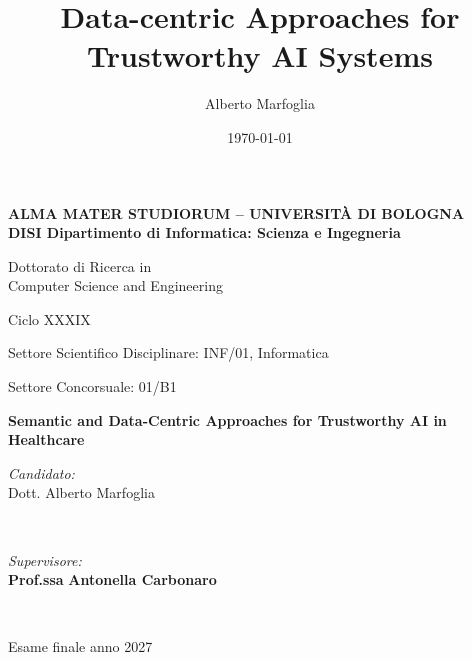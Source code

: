 \title{Data-centric Approaches for Trustworthy AI Systems}
\author{Alberto Marfoglia}
\date{\today}

\begin{titlepage}
	\begin{center}

		\large
		\textbf{ALMA MATER STUDIORUM -- UNIVERSITÀ DI BOLOGNA \\ DISI Dipartimento di Informatica: Scienza e Ingegneria}
		\\
		\noindent\hrulefill
		\vspace{0.4cm}

		\Large
		Dottorato di Ricerca in \\
		Computer Science and Engineering

		\vspace{0.4cm}

		Ciclo XXXIX

		\vspace{0.4cm}

		Settore Scientifico Disciplinare: INF/01, Informatica

		Settore Concorsuale: 01/B1

		\Huge
		\vspace{3cm}
		\textbf{
			Semantic and Data-Centric Approaches for Trustworthy AI in Healthcare
		}

		{\Large{
		\vspace{3cm}

		\textit{Candidato:\\}
		\centering
		Dott. Alberto Marfoglia}
		\\}
		\large
		\vspace{2.5cm}
		\begin{minipage}[t]{0.64\textwidth}
			\begin{flushleft}
			\end{flushleft}
		\end{minipage}
		\begin{minipage}[t]{0.34\textwidth}
			\begin{flushright}
				\textit{Supervisore:}
				\\
				\textbf{Prof.ssa} \textbf{Antonella Carbonaro}
				\\
			\end{flushright}

		\end{minipage}\\

		\vfill
		\noindent\hrulefill
		\vspace{0.3cm}
		\Large

		Esame finale anno 2027
	\end{center}
\end{titlepage}
\restoregeometry